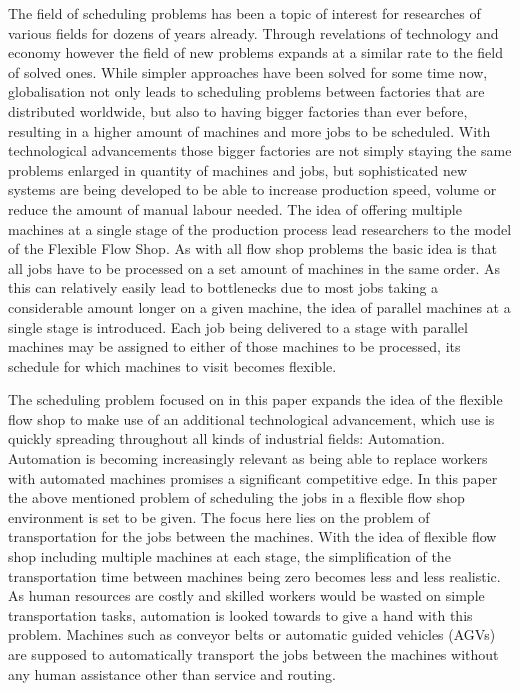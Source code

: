 

The field of scheduling problems has been a topic of interest for researches of various fields for dozens of years already. Through
revelations of technology and economy however the field of new problems expands at a similar rate to the field of solved ones. While simpler
approaches have been solved for some time now, globalisation not only leads to scheduling problems between factories 
that are distributed worldwide, but also to having bigger factories than ever before, resulting in a higher amount of machines and more jobs
to be scheduled. With technological advancements those bigger factories are not simply staying the same problems enlarged in
quantity of machines and jobs, but sophisticated new systems are being developed to be able to increase production speed, volume or reduce
the amount of manual labour needed. The idea of offering multiple machines at a single stage of the production process lead researchers to the
model of the Flexible Flow Shop. As with all flow shop problems the basic idea is that all jobs have to be processed on a set amount of machines in
the same order. As this can relatively easily lead to bottlenecks due to most jobs taking a considerable amount longer on a given machine, the idea
of parallel machines at a single stage is introduced. Each job being delivered to a stage with parallel machines may be assigned to either of
those machines to be processed, its schedule for which machines to visit becomes flexible. 

The scheduling problem focused on in this paper expands
the idea of the flexible flow shop to make use of an additional technological advancement, which use is quickly spreading throughout all kinds of
industrial fields: Automation. Automation is becoming increasingly relevant as being able to replace workers with automated machines promises a
significant competitive edge. In this paper the above mentioned problem of scheduling the jobs in a flexible flow shop environment is set to be
given. The focus here lies on the problem of transportation for the jobs between the machines. With the idea of flexible flow shop including multiple
machines at each stage, the simplification of the transportation time between machines being zero becomes less and less realistic. As human resources
are costly and skilled workers would be wasted on simple transportation tasks, automation is looked towards to give a hand with this problem.
Machines such as conveyor belts or automatic guided vehicles (AGVs) are supposed to automatically transport the jobs between the machines without
any human assistance other than service and routing. 

